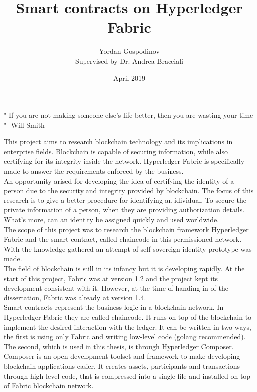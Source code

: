 \documentclass[a4paper,11pt]{report}
\title{Smart contracts on Hyperledger Fabric}
\author{
{Yordan Gospodinov} \\
{\small{Supervised by Dr. Andrea Bracciali}}
}
\date{April 2019}
\begin{document}
\maketitle				




\begin{center}
\Huge " If you are not making someone else's life better, then you are wasting your time " -Will Smith
\end{center}

\clearpage    



This project aims to research blockchain technology and its implications in enterprise fields. Blockchain is capable of securing information, while also certifying for its integrity inside the network. Hyperledger Fabric is specifically made to answer the requirements enforced by the business.  
\\  

  An opportunity arised for developing the idea of certifying the identity of a person due to the security and integrity provided by blockchain. The focus of this research is to give a better procedure for identifying an idividual. To secure the private information of a person, when they are providing authorization details. What's more, can an identity be assigned quickly and used worldwide.
\\

	The scope of this project was to research the blockchain framework Hyperledger Fabric and the smart contract, called chaincode in this permissioned network. With the knowledge gathered an attempt of self-sovereign identity prototype was made.
\\
 
	The field of blockchain is still in its infancy but it is developing rapidly. At the start of this project, Fabric was at version 1.2 and the project kept its development consistent with it. However, at the time of handing in of the dissertation, Fabric was already at version 1.4. 
\\

	Smart contracts represent the business logic in a blockchain network. In Hyperledger Fabric they are called chaincode. It runs on top of the blockchain to implement the desired interaction with the ledger. It can be written in two ways, the first is using only Fabric and writing low-level code (golang recommended). The second, which is used in this thesis, is through Hyperledger Composer. Composer is an open development toolset and framework to make developing blockchain applications easier. It creates assets, participants and transactions through high-level code, that is compressed into a single file and installed on top of Fabric blockchain network. 
\end{document}

